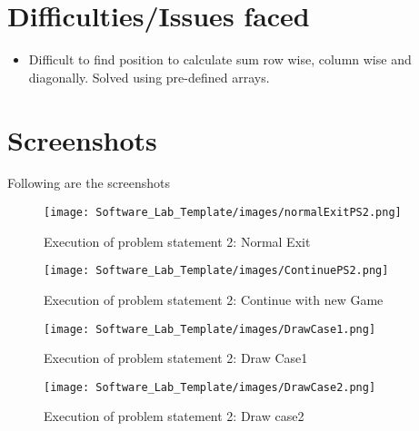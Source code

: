 \documentclass[11pt,oneside]{book}
\begin{document}
\section{Difficulties/Issues faced}
\begin{itemize}
    \item Difficult to find position to calculate sum row wise, column wise and diagonally. Solved using pre-defined arrays.
\end{itemize}

\section{Screenshots}
Following are the screenshots
\begin{figure}[h]
    \texttt{[image: Software\_Lab\_Template/images/normalExitPS2.png]}
  \caption{Execution of problem statement 2: Normal Exit}
  \label{fig:Problem statement 2}
\end{figure}
\begin{figure}[h]
    \texttt{[image: Software\_Lab\_Template/images/ContinuePS2.png]}
  \caption{Execution of problem statement 2: Continue with new Game}
  \label{fig:Problem statement 2}
\end{figure}
\begin{figure}[h]
    \texttt{[image: Software\_Lab\_Template/images/DrawCase1.png]}
  \caption{Execution of problem statement 2: Draw Case1}
  \label{fig:Problem statement 2}
\end{figure}
\begin{figure}[h]
    \texttt{[image: Software\_Lab\_Template/images/DrawCase2.png]}
  \caption{Execution of problem statement 2: Draw case2}
  \label{fig:Problem statement 2}
\end{figure}
\end{document}
